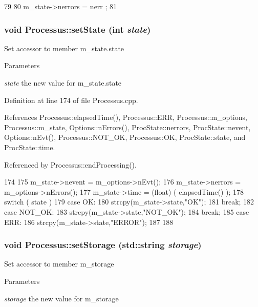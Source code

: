 \begin{DoxyCode}
79                                              {
80   m_state->nerrors = nerr ;
81 }
\end{DoxyCode}
\hypertarget{classProcessus_ad38cde0f1bcefa00b068e7947b8af927}{
\subsubsection[{setState}]{\setlength{\rightskip}{0pt plus 5cm}void Processus::setState (int {\em state})}}
\label{classProcessus_ad38cde0f1bcefa00b068e7947b8af927}
Set accessor to member m\_\-state.state 
\begin{DoxyParams}{Parameters}
\item[{\em state}]the new value for m\_\-state.state \end{DoxyParams}


Definition at line 174 of file Processus.cpp.

References Processus::elapsedTime(), Processus::ERR, Processus::m\_\-options, Processus::m\_\-state, Options::nErrors(), ProcState::nerrors, ProcState::nevent, Options::nEvt(), Processus::NOT\_\-OK, Processus::OK, ProcState::state, and ProcState::time.

Referenced by Processus::endProcessing().


\begin{DoxyCode}
174                                      {
175   m_state->nevent  = m_options->nEvt();
176   m_state->nerrors = m_options->nErrors();
177   m_state->time    = (float) ( elapsedTime() );
178   switch ( state ){
179   case OK:
180     strcpy(m_state->state,"OK");
181     break;
182   case NOT_OK:
183     strcpy(m_state->state,"NOT_OK");
184     break;
185   case ERR:
186     strcpy(m_state->state,"ERROR");
187   }
188 }
\end{DoxyCode}
\hypertarget{classProcessus_ad57a29b33f9021eda9f6929136f1784f}{
\subsubsection[{setStorage}]{\setlength{\rightskip}{0pt plus 5cm}void Processus::setStorage (std::string {\em storage})}}
\label{classProcessus_ad57a29b33f9021eda9f6929136f1784f}
Set accessor to member m\_\-storage 
\begin{DoxyParams}{Parameters}
\item[{\em storage}]the new value for m\_\-storage \end{DoxyParams}


